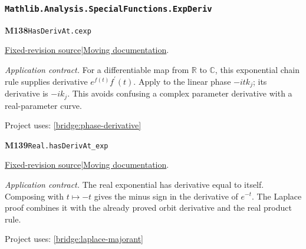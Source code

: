 \documentclass[11pt,a4paper]{article}
\theoremstyle{definition}
\theoremstyle{remark}
\begin{document}
\subsubsection*{\nolinkurl{Mathlib.Analysis.SpecialFunctions.ExpDeriv}}
\noindent\textbf{M138}\label{base:M138}\quad\nolinkurl{HasDerivAt.cexp}

\href{https://github.com/leanprover-community/mathlib4/blob/9bac2d0692944a775113f7c130fd5e5b4608a854/Mathlib/Analysis/SpecialFunctions/ExpDeriv.lean}{Fixed-revision source}\quad|\quad\href{https://leanprover-community.github.io/mathlib4_docs/Mathlib/Analysis/SpecialFunctions/ExpDeriv.html#HasDerivAt.cexp}{Moving documentation}.\par
\noindent\textit{Application contract.} For a differentiable map from $\mathbb R$ to $\mathbb C$, this exponential chain rule supplies derivative $e^{f(t)}f^{\prime}(t)$. Apply to the linear phase $-itk_j$; its derivative is $-ik_j$. This avoids confusing a complex parameter derivative with a real-parameter curve.\par
{\small Project uses: \ref{bridge:phase-derivative}}\par\medskip

\noindent\textbf{M139}\label{base:M139}\quad\nolinkurl{Real.hasDerivAt_exp}

\href{https://github.com/leanprover-community/mathlib4/blob/9bac2d0692944a775113f7c130fd5e5b4608a854/Mathlib/Analysis/SpecialFunctions/ExpDeriv.lean}{Fixed-revision source}\quad|\quad\href{https://leanprover-community.github.io/mathlib4_docs/Mathlib/Analysis/SpecialFunctions/ExpDeriv.html#Real.hasDerivAt_exp}{Moving documentation}.\par
\noindent\textit{Application contract.} The real exponential has derivative equal to itself. Composing with $t\mapsto-t$ gives the minus sign in the derivative of $e^{-t}$. The Laplace proof combines it with the already proved orbit derivative and the real product rule.\par
{\small Project uses: \ref{bridge:laplace-majorant}}\par\medskip


\end{document}
